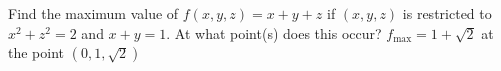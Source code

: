 {Find the maximum value of $f(x,y,z) = x+y+z$ if $(x,y,z)$ is restricted to $x^2+z^2 = 2$ and $x+y=1$. At what point(s) does this occur?
}
{$f_{\text{max}}= 1+\sqrt{2}$ at the point $\left( 0,1,\sqrt{2}\right)$}